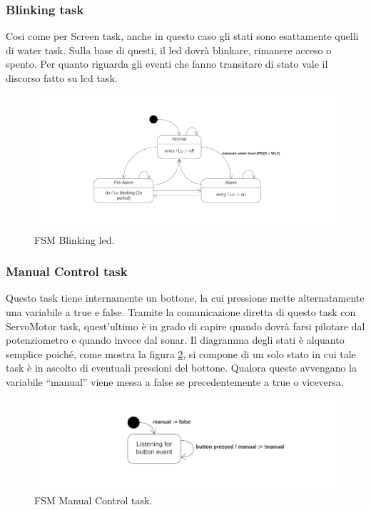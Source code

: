 \documentclass[a4paper,12pt]{report}
\begin{document}
\subsubsection{Blinking task}
Cosi come per Screen task, anche in questo caso gli stati sono esattamente quelli di water task. Sulla base di questi, il led dovrà blinkare, rimanere acceso o spento. Per quanto riguarda gli eventi che fanno transitare di stato vale il discorso fatto su lcd task.

\begin{figure}[H]
\centering
\includegraphics[width=\textwidth]{img/State - Blinking.png}
\caption{FSM Blinking led.}
\label{fig:FSMBlinking}
\end{figure}

\subsubsection{Manual Control task}
Questo task tiene internamente un bottone, la cui pressione mette alternatamente una variabile a true e false. Tramite la comunicazione diretta di questo task con ServoMotor task, quest'ultimo è in grado di capire quando dovrà farsi pilotare dal potenziometro e quando invece dal sonar.
Il diagramma degli stati è alquanto semplice poiché, come mostra la figura \ref{fig:FSMManual}, si compone di un solo stato in cui tale task è in ascolto di eventuali pressioni del bottone. Qualora queste avvengano la variabile ``manual'' viene messa a false se precedentemente a true o viceversa.

\begin{figure}[H]
\centering
\includegraphics[width=\textwidth]{img/State - ManualTask.png}
\caption{FSM Manual Control task.}
\label{fig:FSMManual}
\end{figure}
\end{document}
